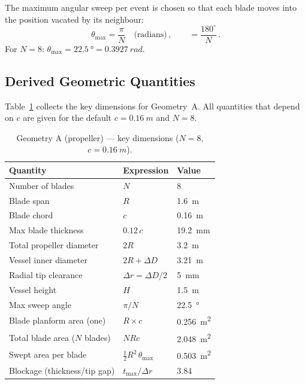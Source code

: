 \documentclass[11pt,a4paper]{article}
\begin{document}
The maximum angular sweep per event is chosen so that each blade moves
into the position vacated by its neighbour:
\begin{equation}
  \theta_\mathrm{max} = \frac{\pi}{N}
  \quad\text{(radians)}\,,
  \qquad
  = \frac{180^\circ}{N}\,.
  \label{eq:theta_max}
\end{equation}
For $N = 8$: $\theta_\mathrm{max} = \SI{22.5}{\degree}
= \SI{0.3927}{rad}$.

\subsection{Derived Geometric Quantities}

Table~\ref{tab:propA} collects the key dimensions for Geometry~A.
All quantities that depend on $c$ are given for the default
$c = \SI{0.16}{m}$ and $N = 8$.

\begin{table}[H]
\centering
\caption{Geometry A (propeller) — key dimensions ($N = 8$,
$c = \SI{0.16}{m}$).}
\label{tab:propA}
\begin{tabular}{lll}
\toprule
Quantity & Expression & Value \\
\midrule
Number of blades       & $N$                           & 8 \\
Blade span             & $R$                           & \SI{1.6}{m} \\
Blade chord            & $c$                           & \SI{0.16}{m} \\
Max blade thickness    & $0.12\,c$                     & \SI{19.2}{mm} \\
Total propeller diameter & $2R$                        & \SI{3.2}{m} \\
Vessel inner diameter  & $2R + \Delta D$               & \SI{3.21}{m} \\
Radial tip clearance   & $\Delta r = \Delta D/2$       & \SI{5}{mm} \\
Vessel height          & $H$                           & \SI{1.5}{m} \\
Max sweep angle        & $\pi / N$                     & \SI{22.5}{\degree} \\
Blade planform area (one) & $R \times c$               & \SI{0.256}{m^2} \\
Total blade area ($N$ blades) & $N R c$                & \SI{2.048}{m^2} \\
Swept area per blade   & $\tfrac{1}{2}R^2\,\theta_\mathrm{max}$
                                                        & \SI{0.503}{m^2} \\
Blockage (thickness/tip gap) & $t_\mathrm{max}/\Delta r$
                                                        & 3.84 \\
\bottomrule
\end{tabular}
\end{table}
\end{document}
